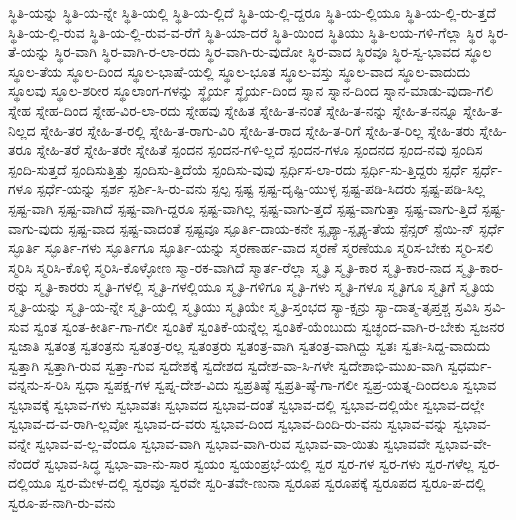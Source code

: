 {ಸ್ಥಿತಿ-ಯನ್ನು
ಸ್ಥಿತಿ-ಯ-ನ್ನೇ
ಸ್ಥಿತಿ-ಯಲ್ಲಿ
ಸ್ಥಿತಿ-ಯ-ಲ್ಲಿದೆ
ಸ್ಥಿತಿ-ಯ-ಲ್ಲಿ-ದ್ದರೂ
ಸ್ಥಿತಿ-ಯ-ಲ್ಲಿಯೂ
ಸ್ಥಿತಿ-ಯ-ಲ್ಲಿ-ರು-ತ್ತದೆ
ಸ್ಥಿತಿ-ಯ-ಲ್ಲಿ-ರುವ
ಸ್ಥಿತಿ-ಯ-ಲ್ಲಿ-ರುವ-ವ-ರೆಗೆ
ಸ್ಥಿತಿ-ಯಾ-ದರೆ
ಸ್ಥಿತಿ-ಯಿಂದ
ಸ್ಥಿತಿಯು
ಸ್ಥಿತಿ-ಲಯ-ಗಳಿ-ಗೆಲ್ಲಾ
ಸ್ಥಿರ
ಸ್ಥಿರ-ತೆ-ಯನ್ನು
ಸ್ಥಿರ-ವಾಗಿ
ಸ್ಥಿರ-ವಾಗಿ-ರ-ಲಾ-ರದು
ಸ್ಥಿರ-ವಾಗಿ-ರು-ವುದೋ
ಸ್ಥಿರ-ವಾದ
ಸ್ಥಿರವೂ
ಸ್ಥಿರ-ಸ್ವ-ಭಾವದ
ಸ್ಥೂಲ
ಸ್ಥೂಲ-ತೆಯ
ಸ್ಥೂಲ-ದಿಂದ
ಸ್ಥೂಲ-ಭಾಷೆ-ಯಲ್ಲಿ
ಸ್ಥೂಲ-ಭೂತ
ಸ್ಥೂಲ-ವಸ್ತು
ಸ್ಥೂಲ-ವಾದ
ಸ್ಥೂಲ-ವಾದುದು
ಸ್ಥೂಲವು
ಸ್ಥೂಲ-ಶರೀರ
ಸ್ಥೂಲಾಂಗ-ಗಳನ್ನು
ಸ್ಥೈರ್ಯ
ಸ್ಥೈರ್ಯ-ದಿಂದ
ಸ್ನಾನ
ಸ್ನಾನ-ದಿಂದ
ಸ್ನಾನ-ಮಾಡು-ವುದಾ-ಗಲಿ
ಸ್ನೇಹ
ಸ್ನೇಹ-ದಿಂದ
ಸ್ನೇಹ-ವಿರ-ಲಾ-ರದು
ಸ್ನೇಹವು
ಸ್ನೇಹಿತ
ಸ್ನೇಹಿ-ತ-ನಂತೆ
ಸ್ನೇಹಿ-ತ-ನನ್ನು
ಸ್ನೇಹಿ-ತ-ನನ್ನೂ
ಸ್ನೇಹಿ-ತ-ನಿಲ್ಲದ
ಸ್ನೇಹಿ-ತರ
ಸ್ನೇಹಿ-ತ-ರಲ್ಲಿ
ಸ್ನೇಹಿ-ತ-ರಾಗು-ವಿರಿ
ಸ್ನೇಹಿ-ತ-ರಾದ
ಸ್ನೇಹಿ-ತ-ರಿಗೆ
ಸ್ನೇಹಿ-ತ-ರಿಲ್ಲ
ಸ್ನೇಹಿ-ತರು
ಸ್ನೇಹಿ-ತರೂ
ಸ್ನೇಹಿ-ತರೆ
ಸ್ನೇಹಿ-ತರೇ
ಸ್ನೇಹಿತೆ
ಸ್ಪಂದನ
ಸ್ಪಂದನ-ಗಳಿ-ಲ್ಲದೆ
ಸ್ಪಂದನ-ಗಳೂ
ಸ್ಪಂದನದ
ಸ್ಪಂದ-ನವು
ಸ್ಪಂದಿಸ
ಸ್ಪಂದಿ-ಸುತ್ತದೆ
ಸ್ಪಂದಿಸುತ್ತಿತ್ತು
ಸ್ಪಂದಿಸು-ತ್ತಿದೆಯೆ
ಸ್ಪಂದಿಸು-ವುವು
ಸ್ಪರ್ಧಿಸ-ಲಾ-ರದು
ಸ್ಪರ್ಧಿ-ಸು-ತ್ತಿದ್ದರು
ಸ್ಪರ್ಧೆ
ಸ್ಪರ್ಧೆ-ಗಳೂ
ಸ್ಪರ್ಧೆ-ಯನ್ನು
ಸ್ಪರ್ಶ
ಸ್ಪರ್ಶಿ-ಸಿ-ರು-ವನು
ಸ್ಪಲ್ಪ
ಸ್ಪಷ್ಟ
ಸ್ಪಷ್ಟ-ದೃಷ್ಟಿ-ಯುಳ್ಳ
ಸ್ಪಷ್ಟ-ಪಡಿ-ಸಿದರು
ಸ್ಪಷ್ಟ-ಪಡಿ-ಸಿಲ್ಲ
ಸ್ಪಷ್ಟ-ವಾಗಿ
ಸ್ಪಷ್ಟ-ವಾಗಿದೆ
ಸ್ಪಷ್ಟ-ವಾಗಿ-ದ್ದರೂ
ಸ್ಪಷ್ಟ-ವಾಗಿಲ್ಲ
ಸ್ಪಷ್ಟ-ವಾಗು-ತ್ತದೆ
ಸ್ಪಷ್ಟ-ವಾಗುತ್ತಾ
ಸ್ಪಷ್ಟ-ವಾಗು-ತ್ತಿದೆ
ಸ್ಪಷ್ಟ-ವಾಗು-ವುದು
ಸ್ಪಷ್ಟ-ವಾದ
ಸ್ಪಷ್ಟ-ವಾದಂತೆ
ಸ್ಪಷ್ಟವೂ
ಸ್ಪೂರ್ತಿ-ದಾಯ-ಕನೇ
ಸ್ಪೃಶ್ಯಾ-ಸ್ಪೃಶ್ಯ-ತೆಯ
ಸ್ಪೆನ್ಸರ್
ಸ್ಪೆಯಿ-ನ್
ಸ್ಫರ್ಧೆ
ಸ್ಫೂರ್ತಿ
ಸ್ಫೂರ್ತಿ-ಗಳು
ಸ್ಫೂರ್ತಿಗೂ
ಸ್ಫೂರ್ತಿ-ಯನ್ನು
ಸ್ಮರಣಾರ್ಹ-ವಾದ
ಸ್ಮರಣೆ
ಸ್ಮರಣೆಯೂ
ಸ್ಮರಿಸ-ಬೇಕು
ಸ್ಮರಿ-ಸಲಿ
ಸ್ಮರಿಸಿ
ಸ್ಮರಿಸಿ-ಕೊಳ್ಳಿ
ಸ್ಮರಿಸಿ-ಕೊಳ್ಳೋಣ
ಸ್ಮಾ-ರಕ-ವಾಗಿದೆ
ಸ್ಮಾರ್ತ-ರೆಲ್ಲಾ
ಸ್ಮೃತಿ
ಸ್ಮೃತಿ-ಕಾರ
ಸ್ಮೃತಿ-ಕಾರ-ನಾದ
ಸ್ಮೃತಿ-ಕಾರ-ರನ್ನು
ಸ್ಮೃತಿ-ಕಾರರು
ಸ್ಮೃತಿ-ಗಳಲ್ಲಿ
ಸ್ಮೃತಿ-ಗಳಲ್ಲಿಯೂ
ಸ್ಮೃತಿ-ಗಳಿಗೂ
ಸ್ಮೃತಿ-ಗಳು
ಸ್ಮೃತಿ-ಗಳೂ
ಸ್ಮೃತಿಗೂ
ಸ್ಮೃತಿಗೆ
ಸ್ಮೃತಿಯ
ಸ್ಮೃತಿ-ಯನ್ನು
ಸ್ಮೃತಿ-ಯ-ನ್ನೇ
ಸ್ಮೃತಿ-ಯಲ್ಲಿ
ಸ್ಮೃತಿಯು
ಸ್ಮೃತಿಯೇ
ಸ್ಮೃತಿ-ಸ್ತಂಭದ
ಸ್ಯಾ-ಕ್ಸನ್ರು
ಸ್ಯಾ-ದಾತ್ಮ-ತೃಪ್ತಶ್ಚ
ಸ್ರವಿಸಿ
ಸ್ರವಿ-ಸುವ
ಸ್ವಂತ
ಸ್ವಂತ-ಕೀರ್ತಿ-ಗಾ-ಗಲೀ
ಸ್ವಂತಿಕೆ
ಸ್ವಂತಿಕೆ-ಯನ್ನೆಲ್ಲ
ಸ್ವಂತಿಕೆ-ಯೆಂಬುದು
ಸ್ವಚ್ಛಂದ-ವಾಗಿ-ರ-ಬೇಕು
ಸ್ವಜನರ
ಸ್ವಜಾತಿ
ಸ್ವತಂತ್ರ
ಸ್ವತಂತ್ರನು
ಸ್ವತಂತ್ರ-ರಲ್ಲ
ಸ್ವತಂತ್ರರು
ಸ್ವತಂತ್ರ-ವಾಗಿ
ಸ್ವತಂತ್ರ-ವಾಗಿದ್ದು
ಸ್ವತಃ
ಸ್ವತಃ-ಸಿದ್ದ-ವಾದುದು
ಸ್ವತ್ತಾಗಿ
ಸ್ವತ್ತಾಗಿ-ರುವ
ಸ್ವತ್ತಾ-ಗುವ
ಸ್ವದೇಶಕ್ಕೆ
ಸ್ವದೇಶದ
ಸ್ವದೇಶ-ವಾ-ಸಿ-ಗಳೇ
ಸ್ವದೇಶಾಭಿ-ಮುಖ-ವಾಗಿ
ಸ್ವಧರ್ಮ-ವನ್ನನು-ಸ-ರಿಸಿ
ಸ್ವಧಾ
ಸ್ವಪಕ್ಷ-ಗಳ
ಸ್ವಪ್ನ-ದೇಶ-ವಿದು
ಸ್ವಪ್ರತಿಷ್ಠೆ
ಸ್ವಪ್ರತಿ-ಷ್ಠೆ-ಗಾ-ಗಲೀ
ಸ್ವಪ್ರ-ಯತ್ನ-ದಿಂದಲೂ
ಸ್ವಭಾವ
ಸ್ವಭಾವಕ್ಕೆ
ಸ್ವಭಾವ-ಗಳು
ಸ್ವಭಾವತಃ
ಸ್ವಭಾವದ
ಸ್ವಭಾವ-ದಂತೆ
ಸ್ವಭಾವ-ದಲ್ಲಿ
ಸ್ವಭಾವ-ದಲ್ಲಿಯೇ
ಸ್ವಭಾವ-ದಲ್ಲೇ
ಸ್ವಭಾವ-ದ-ವ-ರಾಗಿ-ಲ್ಲವೋ
ಸ್ವಭಾವ-ದ-ವರು
ಸ್ವಭಾವ-ದಿಂದ
ಸ್ವಭಾವ-ದಿಂದಿ-ರು-ವನು
ಸ್ವಭಾವ-ವನ್ನು
ಸ್ವಭಾವ-ವನ್ನೇ
ಸ್ವಭಾವ-ವ-ಲ್ಲ-ವೆಂದೂ
ಸ್ವಭಾವ-ವಾಗಿ
ಸ್ವಭಾವ-ವಾಗಿ-ರುವ
ಸ್ವಭಾವ-ವಾ-ಯಿತು
ಸ್ವಭಾವವೇ
ಸ್ವಭಾವ-ವೇ-ನೆಂದರೆ
ಸ್ವಭಾವ-ಸಿದ್ಧ
ಸ್ವಭಾ-ವಾ-ನು-ಸಾರ
ಸ್ವಯಂ
ಸ್ವಯಂಪ್ರಭೆ-ಯಲ್ಲಿ
ಸ್ವರ
ಸ್ವರ-ಗಳ
ಸ್ವರ-ಗಳು
ಸ್ವರ-ಗಳೆಲ್ಲ
ಸ್ವರ-ದಲ್ಲಿಯೂ
ಸ್ವರ-ಮೇಳ-ದಲ್ಲಿ
ಸ್ವರವೂ
ಸ್ವರವೇ
ಸ್ವರಿ-ತವೇ-ಣುನಾ
ಸ್ವರೂಪ
ಸ್ವರೂಪಕ್ಕೆ
ಸ್ವರೂಪದ
ಸ್ವರೂ-ಪ-ದಲ್ಲಿ
ಸ್ವರೂ-ಪ-ನಾಗಿ-ರು-ವನು
}
